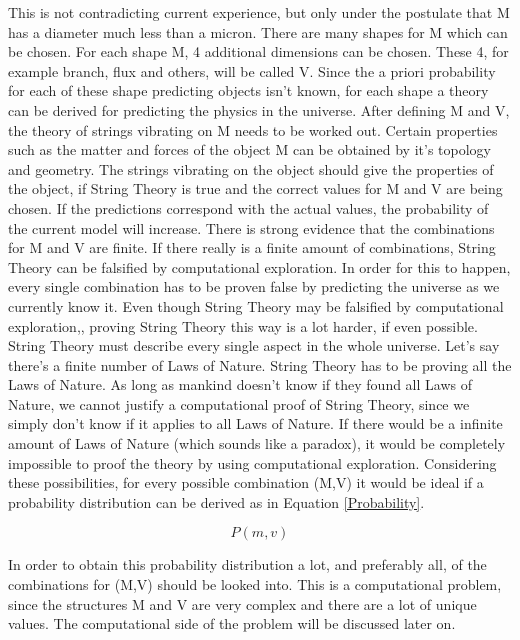 \documentclass[../paper.tex]{subfiles}
\begin{document}
This is not contradicting current experience, but only under the postulate that M has a diameter much less than a micron. There are many shapes for M which can be chosen. For each shape M, 4 additional dimensions can be chosen. These 4, for example branch, flux and others,  will be called V. Since the a priori probability for each of these shape predicting objects isn't known, for each shape a theory can be derived for predicting the physics in the universe. After defining M and V, the theory of strings vibrating on M needs to be worked out. Certain properties such as the matter and forces of the object M can be obtained by it's topology and geometry. The strings vibrating on the object should give the properties of the object, if String Theory is true and the correct values for M and V are being chosen. If the predictions correspond with the actual values, the probability of the current model will increase. There is strong evidence that the combinations for M and V are finite. If there really is a finite amount of combinations, String Theory can be falsified by computational exploration. In order for this to happen, every single combination has to be proven false by predicting the universe as we currently know it. Even though String Theory may be falsified by computational exploration,, proving String Theory this way is a lot harder, if even possible. String Theory must describe every single aspect in the whole universe. Let's say there's a finite number of Laws of Nature. String Theory has to be proving all the Laws of Nature. As long as mankind doesn't know if they found all Laws of Nature, we cannot justify a computational proof of String Theory, since we simply don't know if it applies to all Laws of Nature. If there would be a infinite amount of Laws of Nature (which sounds like a paradox), it would be completely impossible to proof the theory by using computational exploration. Considering these possibilities, for every possible combination (M,V) it would be ideal if a probability distribution can be derived as in Equation \ref{Probability}.

\begin{equation}
    P(m,v)
    \label{Probability}
\end{equation}

In order to obtain this probability distribution a lot, and preferably all, of the combinations for (M,V) should be looked into. This is a computational problem, since the structures M and V are very complex and there are a lot of unique values. The computational side of the problem will be discussed later on.
\end{document}
